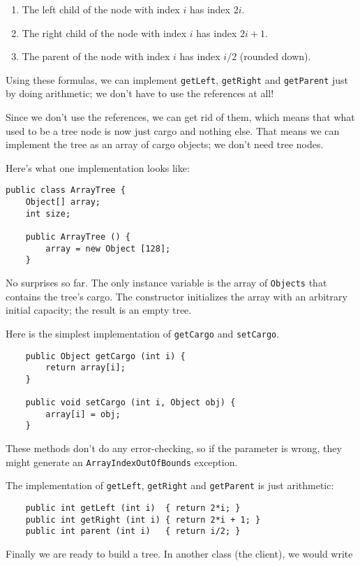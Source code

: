 \begin{enumerate}

\item The left child of the node with index $i$ has index $2i$.

\item The right child of the node with index $i$ has index $2i + 1$.

\item The parent of the node with index $i$ has index $i/2$ (rounded down).

\end{enumerate}

Using these formulas, we can implement {\tt getLeft}, {\tt getRight}
and {\tt getParent} just by doing arithmetic; we don't have to
use the references at all!

Since we don't use the references, we can get rid of them,
which means that what used to be a tree node is now just cargo
and nothing else.  That means we can implement the tree as an
array of cargo objects; we don't need tree nodes.

Here's what one implementation looks like:

\begin{verbatim}
public class ArrayTree {
    Object[] array;
    int size;

    public ArrayTree () {
        array = new Object [128];
    }
\end{verbatim}
%
No surprises so far.  The only instance variable is
the array of {\tt Objects} that contains the tree's cargo.
The constructor initializes the array
with an arbitrary initial capacity; the result is an empty tree.

Here is the simplest implementation of {\tt getCargo}
and {\tt setCargo}.

\begin{verbatim}
    public Object getCargo (int i) {
        return array[i];
    }

    public void setCargo (int i, Object obj) {
        array[i] = obj;
    }
\end{verbatim}

These methods don't do any error-checking, so if the parameter is
wrong, they might generate an {\tt ArrayIndexOutOfBounds}
exception.

The implementation of {\tt getLeft}, {\tt getRight}
and {\tt getParent} is just arithmetic:

\begin{verbatim}
    public int getLeft (int i)  { return 2*i; }
    public int getRight (int i) { return 2*i + 1; }
    public int parent (int i)   { return i/2; }
\end{verbatim}
%
Finally we are ready to build a tree.  In another class (the client),
we would write

